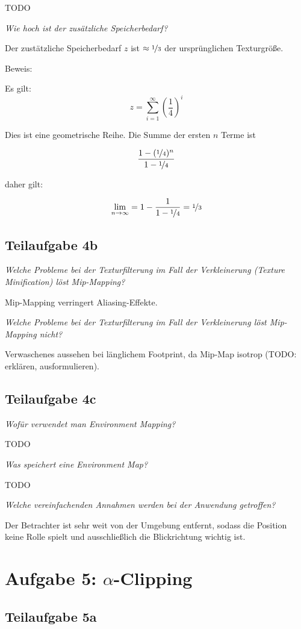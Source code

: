 \documentclass[a4paper]{scrartcl}
\begin{document}
TODO

\textit{Wie hoch ist der zusätzliche Speicherbedarf?}

Der zustätzliche Speicherbedarf $z$ ist $\approx \nicefrac{1}{3}$ der ursprünglichen
Texturgröße.

Beweis:

Es gilt:
\[z = \sum_{i=1}^\infty \left (\frac{1}{4} \right )^i\]

Dies ist eine geometrische Reihe. Die Summe der ersten $n$ Terme ist

\[\frac{1- (\nicefrac{1}{4})^n}{1 - \nicefrac{1}{4}}\]

daher gilt:

\[\lim_{n \rightarrow \infty} = 1 - \frac{1}{1 - \nicefrac{1}{4}} = \nicefrac{1}{3}\]

\subsection*{Teilaufgabe 4b}
\textit{Welche Probleme bei der Texturfilterung im Fall der Verkleinerung (Texture Minification) löst Mip-Mapping?}

Mip-Mapping verringert Aliasing-Effekte.

\textit{Welche Probleme bei der Texturfilterung im Fall der Verkleinerung löst Mip-Mapping nicht?}

Verwaschenes aussehen bei länglichem Footprint, da Mip-Map isotrop (TODO: erklären, ausformulieren).

\subsection*{Teilaufgabe 4c}
\textit{Wofür verwendet man Environment Mapping?}

TODO

\textit{Was speichert eine Environment Map?}

TODO

\textit{Welche vereinfachenden Annahmen werden bei der Anwendung getroffen?}

Der Betrachter ist sehr weit von der Umgebung entfernt, sodass die Position
keine Rolle spielt und ausschließlich die Blickrichtung wichtig ist.


\section*{Aufgabe 5: $\alpha$-Clipping}
\subsection*{Teilaufgabe 5a}
\end{document}
